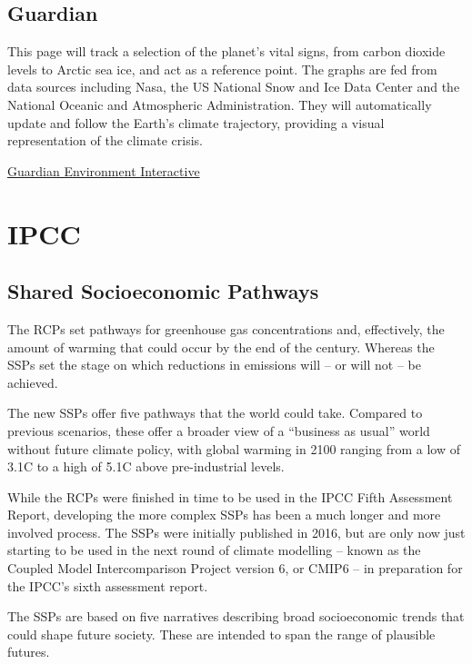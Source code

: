 \documentclass[
]{book}
\begin{document}
\hypertarget{guardian}{%
\section{Guardian}\label{guardian}}

This page will track a selection of the planet's vital signs, from carbon dioxide levels to Arctic sea ice, and act as a reference point. The graphs are fed from data sources including Nasa, the US National Snow and Ice Data Center and the National Oceanic and Atmospheric Administration. They will automatically update and follow the Earth's climate trajectory, providing a visual representation of the climate crisis.

\href{https://www.theguardian.com/environment/ng-interactive/2020/oct/05/climate-data-dashboard-carbon-atmosphere-sea-level-arctic-ice}{Guardian Environment Interactive}

\hypertarget{ipcc}{%
\chapter{IPCC}\label{ipcc}}

\hypertarget{shared-socioeconomic-pathways}{%
\section{Shared Socioeconomic Pathways}\label{shared-socioeconomic-pathways}}

The RCPs set pathways for greenhouse gas concentrations and, effectively, the amount of warming that could occur by the end of the century. Whereas the SSPs set the stage on which reductions in emissions will -- or will not -- be achieved.

The new SSPs offer five pathways that the world could take. Compared to previous scenarios, these offer a broader view of a ``business as usual'' world without future climate policy, with global warming in 2100 ranging from a low of 3.1C to a high of 5.1C above pre-industrial levels.

While the RCPs were finished in time to be used in the IPCC Fifth Assessment Report, developing the more complex SSPs has been a much longer and more involved process. The SSPs were initially published in 2016, but are only now just starting to be used in the next round of climate modelling -- known as the Coupled Model Intercomparison Project version 6, or CMIP6 -- in preparation for the IPCC's sixth assessment report.

The SSPs are based on five narratives describing broad socioeconomic trends that could shape future society. These are intended to span the range of plausible futures.
\end{document}
